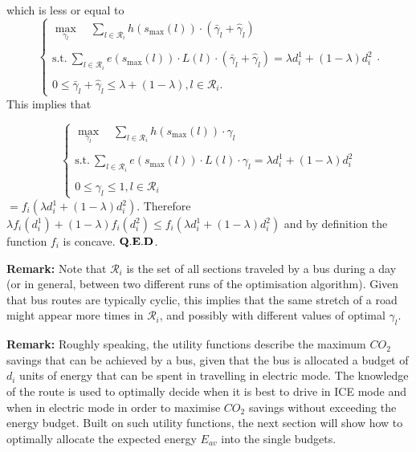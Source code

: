 \documentclass[journal]{IEEEtran}
\begin{document}
which is less or equal to 
\begin{equation}
\left\{\begin{array}{l}
\underset{\gamma_l}{\max} \quad \sum\limits_{l \in \mathcal{R}_i} h\left(s_{\textrm{max}}(l)\right) \cdot  (\bar{\gamma}_l+\hat{\gamma}_l)\\
\\
{\text{s.t.}} ~
\sum\limits_{l \in \mathcal{R}_i} e(s_{\textrm{max}}(l)) \cdot L(l) \cdot (\bar{\gamma}_l + \hat{\gamma}_l) = \lambda d_i^1 + (1-\lambda) d_i^2\\
\\
0 \leq \bar{\gamma}_l + \hat{\gamma}_l  \leq \lambda + (1-\lambda), l \in \mathcal{R}_i.\end{array}\right. .
\end{equation}
This implies that

\begin{equation}
\left\{\begin{array}{l}
\underset{\gamma_l}{\max} \quad \sum\limits_{l \in \mathcal{R}_i} h\left(s_{\textrm{max}}(l)\right) \cdot \gamma_l\\
\\
{\text{s.t.}} ~
\sum\limits_{l \in \mathcal{R}_i} e(s_{\textrm{max}}(l)) \cdot L(l) \cdot \gamma_l = \lambda d_i^1 + (1-\lambda) d_i^2\\
\\
0 \leq \gamma_l  \leq 1, l \in \mathcal{R}_i\end{array}\right.
\end{equation}
$= f_i(\lambda d^1_i+(1-\lambda)d^2_i)$. Therefore $\lambda f_i(d^1_i) + (1-\lambda) f_i(d^2_i) \leq f_i(\lambda d^1_i+(1-\lambda)d^2_i)$ and by definition the function $f_i$ is concave. ${\bf Q.E.D}$.\newline


\noindent \textbf{Remark:} Note that $\mathcal{R}_i$ is the set of all sections traveled by a bus during a day (or in general, between two different runs of the optimisation algorithm). Given that bus routes are typically cyclic, this implies that the same stretch of a road might appear more times in $\mathcal{R}_i$, and possibly with different values of optimal $\gamma_l$.\newline

\noindent \textbf{Remark:} Roughly speaking, the utility functions describe the maximum $CO_2$ savings that can be achieved by a bus, given that the bus is allocated a budget of $d_i$ units of energy that can be spent in travelling in electric mode. The knowledge of the route is used to optimally decide when it is best to drive in ICE mode and when in electric mode in order to maximise $CO_2$ savings without exceeding the energy budget. Built on such utility functions, the next section will show how to optimally allocate the expected energy $E_{av}$ into the single budgets.
\end{document}
